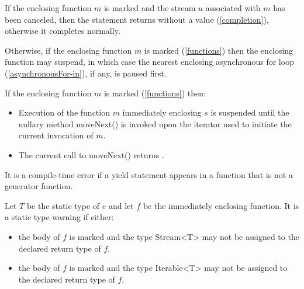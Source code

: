 \documentclass{article}
\newcommand{\code}[1]{{\sf #1}}
\begin{document}
\LMHash{}
If the enclosing function $m$ is marked \ASYNC* and the stream $u$ associated with $m$ has been canceled, then the \YIELD{} statement returns without a value (\ref{completion}), otherwise it completes normally.


\LMHash{}
Otherwise, if the enclosing function $m$ is marked \ASYNC* (\ref{functions}) then the enclosing function may suspend, in which case the nearest enclosing asynchronous for loop (\ref{asynchronousFor-in}), if any, is paused first.



\LMHash{}
If the enclosing function $m$ is marked \SYNC* (\ref{functions}) then:
\begin{itemize}
\item
Execution of the function $m$ immediately enclosing $s$ is suspended until the nullary method \code{moveNext()} is invoked upon the iterator used to initiate the current invocation of $m$.
\item
The current call to \code{moveNext()} returns \TRUE.
\end{itemize}

\LMHash{}
It is a compile-time error if a yield statement appears in a function that is not a generator function.

\LMHash{}
Let $T$ be the static type of $e$ and let $f$ be the immediately enclosing function.  It is a static type warning if either:
\begin{itemize}
\item
 the body of $f$ is marked \ASYNC* and the type \code{Stream<T>} may not be assigned to the declared return type of $f$.
 \item
 the body of $f$ is marked \SYNC* and the type \code{Iterable<T>} may not be assigned to the declared return type of $f$.
 \end{itemize}
\end{document}
